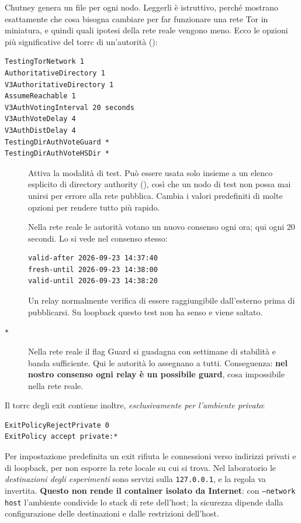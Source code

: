 Chutney genera un file  per ogni nodo. Leggerli è istruttivo, perché mostrano esattamente che cosa bisogna cambiare per far funzionare una rete Tor in miniatura, e quindi quali ipotesi della rete reale vengono meno. Ecco le opzioni più significative del torrc di un'autorità ():

\begin{lstlisting}[language=torrc,numbers=none]
TestingTorNetwork 1
AuthoritativeDirectory 1
V3AuthoritativeDirectory 1
AssumeReachable 1
V3AuthVotingInterval 20 seconds
V3AuthVoteDelay 4
V3AuthDistDelay 4
TestingDirAuthVoteGuard *
TestingDirAuthVoteHSDir *
\end{lstlisting}

\begin{description}
  \item[] Attiva la modalità di test. Può essere usata solo insieme a un elenco esplicito di directory authority (), così che un nodo di test non possa mai unirsi per errore alla rete pubblica. Cambia i valori predefiniti di molte opzioni per rendere tutto più rapido.
  \item[] Nella rete reale le autorità votano un nuovo consenso ogni ora; qui ogni 20 secondi. Lo si vede nel consenso stesso:
\begin{lstlisting}[numbers=none]
valid-after 2026-09-23 14:37:40
fresh-until 2026-09-23 14:38:00
valid-until 2026-09-23 14:38:20
\end{lstlisting}
  \item[] Un relay normalmente verifica di essere raggiungibile dall'esterno prima di pubblicarsi. Su loopback questo test non ha senso e viene saltato.
  \item[ \texttt{*}] Nella rete reale il flag Guard si guadagna con settimane di stabilità e banda sufficiente. Qui le autorità lo assegnano a tutti. Conseguenza: \textbf{nel nostro consenso ogni relay è un possibile guard}, cosa impossibile nella rete reale.
\end{description}

Il torrc degli exit contiene inoltre, \emph{esclusivamente per l'ambiente privato}:
\begin{lstlisting}[language=torrc,numbers=none]
ExitPolicyRejectPrivate 0
ExitPolicy accept private:*
\end{lstlisting}
Per impostazione predefinita un exit rifiuta le connessioni verso indirizzi privati e di loopback, per non esporre la rete locale su cui si trova. Nel laboratorio le \emph{destinazioni degli esperimenti} sono servizi sulla \texttt{127.0.0.1}, e la regola va invertita. \textbf{Questo non rende il container isolato da Internet}: con \texttt{--network host} l'ambiente condivide lo stack di rete dell'host; la sicurezza dipende dalla configurazione delle destinazioni e dalle restrizioni dell'host.

